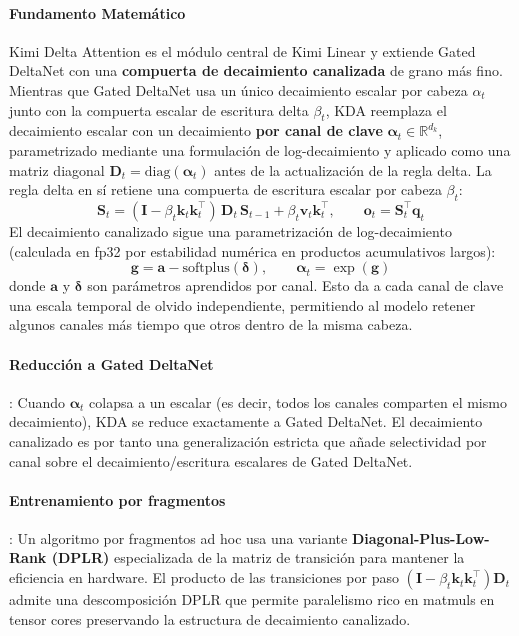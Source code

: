 \paragraph{Fundamento Matemático}

Kimi Delta Attention \citep{kimi_kda_2025} es el módulo central de Kimi Linear y extiende Gated DeltaNet con una \textbf{compuerta de decaimiento canalizada} de grano más fino. Mientras que Gated DeltaNet usa un único decaimiento escalar por cabeza $\alpha_t$ junto con la compuerta escalar de escritura delta $\beta_t$, KDA reemplaza el decaimiento escalar con un decaimiento \textbf{por canal de clave} $\boldsymbol{\alpha}_t \in \mathbb{R}^{d_k}$, parametrizado mediante una formulación de log-decaimiento y aplicado como una matriz diagonal $\mathbf{D}_t = \mathrm{diag}(\boldsymbol{\alpha}_t)$ antes de la actualización de la regla delta. La regla delta en sí retiene una compuerta de escritura escalar por cabeza $\beta_t$:
\[
\mathbf{S}_t = (\mathbf{I} - \beta_t \mathbf{k}_t \mathbf{k}_t^\top)\, \mathbf{D}_t\, \mathbf{S}_{t-1} + \beta_t \mathbf{v}_t \mathbf{k}_t^\top, \qquad \mathbf{o}_t = \mathbf{S}_t^\top \mathbf{q}_t
\]
El decaimiento canalizado sigue una parametrización de log-decaimiento (calculada en fp32 por estabilidad numérica en productos acumulativos largos):
\[
\mathbf{g} = \mathbf{a} - \mathrm{softplus}(\boldsymbol{\delta}), \qquad \boldsymbol{\alpha}_t = \exp(\mathbf{g})
\]
donde $\mathbf{a}$ y $\boldsymbol{\delta}$ son parámetros aprendidos por canal. Esto da a cada canal de clave una escala temporal de olvido independiente, permitiendo al modelo retener algunos canales más tiempo que otros dentro de la misma cabeza.

\paragraph{Reducción a Gated DeltaNet}: Cuando $\boldsymbol{\alpha}_t$ colapsa a un escalar (es decir, todos los canales comparten el mismo decaimiento), KDA se reduce exactamente a Gated DeltaNet. El decaimiento canalizado es por tanto una generalización estricta que añade selectividad por canal sobre el decaimiento/escritura escalares de Gated DeltaNet.

\paragraph{Entrenamiento por fragmentos}: Un algoritmo por fragmentos ad hoc usa una variante \textbf{Diagonal-Plus-Low-Rank (DPLR)} especializada de la matriz de transición para mantener la eficiencia en hardware. El producto de las transiciones por paso $(\mathbf{I} - \beta_t \mathbf{k}_t \mathbf{k}_t^\top)\mathbf{D}_t$ admite una descomposición DPLR que permite paralelismo rico en matmuls en tensor cores preservando la estructura de decaimiento canalizado.

